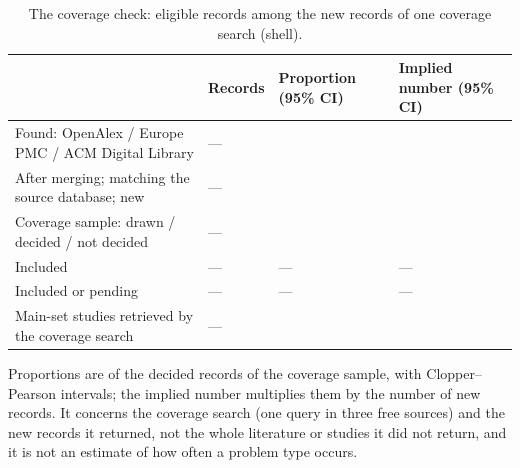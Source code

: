 \begin{table}[!htbp]
\centering
\caption{The coverage check: eligible records among the new records of one coverage search (shell).}
\small
\begin{tabularx}{\linewidth}{Xlll}
\toprule
 & Records & Proportion (95\% CI) & Implied number (95\% CI) \\
\midrule
Found: OpenAlex / Europe PMC / ACM Digital Library & --- & & \\
After merging; matching the source database; new & --- & & \\
Coverage sample: drawn / decided / not decided & --- & & \\
Included & --- & --- & --- \\
Included or pending & --- & --- & --- \\
Main-set studies retrieved by the coverage search & --- & & \\
\bottomrule
\end{tabularx}

\smallskip
\raggedright\footnotesize Proportions are of the decided records of the coverage sample, with Clopper--Pearson
intervals; the implied number multiplies them by the number of new records. It concerns the coverage search (one query
in three free sources) and the new records it returned, not the whole literature or studies it did not return, and it
is not an estimate of how often a problem type occurs.
\end{table}
